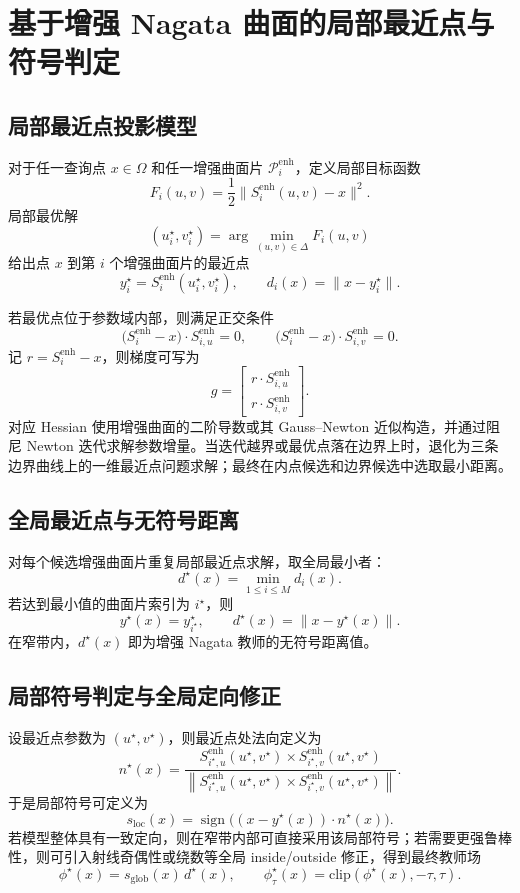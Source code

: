 \documentclass[12pt,oneside]{ctexbook}
\begin{document}
\section{基于增强 Nagata 曲面的局部最近点与符号判定}
\subsection{局部最近点投影模型}
对于任一查询点 $x\in\Omega$ 和任一增强曲面片 $\mathcal P_i^{\mathrm{enh}}$，定义局部目标函数
\[
F_i(u,v)=\frac{1}{2}\|S_i^{\mathrm{enh}}(u,v)-x\|^2.
\]
局部最优解
\[
(u_i^\star,v_i^\star)=\arg\min_{(u,v)\in\Delta}F_i(u,v)
\]
给出点 $x$ 到第 $i$ 个增强曲面片的最近点
\[
y_i^\star=S_i^{\mathrm{enh}}(u_i^\star,v_i^\star),
\qquad
d_i(x)=\|x-y_i^\star\|.
\]

若最优点位于参数域内部，则满足正交条件
\[
\big(S_i^{\mathrm{enh}}-x\big)\cdot S_{i,u}^{\mathrm{enh}}=0,
\qquad
\big(S_i^{\mathrm{enh}}-x\big)\cdot S_{i,v}^{\mathrm{enh}}=0.
\]
记 $r=S_i^{\mathrm{enh}}-x$，则梯度可写为
\[
g=
\begin{bmatrix}
r\cdot S_{i,u}^{\mathrm{enh}}\\
r\cdot S_{i,v}^{\mathrm{enh}}
\end{bmatrix}.
\]
对应 Hessian 使用增强曲面的二阶导数或其 Gauss--Newton 近似构造，并通过阻尼 Newton 迭代求解参数增量。当迭代越界或最优点落在边界上时，退化为三条边界曲线上的一维最近点问题求解；最终在内点候选和边界候选中选取最小距离。

\subsection{全局最近点与无符号距离}
对每个候选增强曲面片重复局部最近点求解，取全局最小者：
\[
d^\star(x)=\min_{1\le i\le M}d_i(x).
\]
若达到最小值的曲面片索引为 $i^\star$，则
\[
y^\star(x)=y_{i^\star}^\star,
\qquad
d^\star(x)=\|x-y^\star(x)\|.
\]
在窄带内，$d^\star(x)$ 即为增强 Nagata 教师的无符号距离值。

\subsection{局部符号判定与全局定向修正}
设最近点参数为 $(u^\star,v^\star)$，则最近点处法向定义为
\[
n^\star(x)=
\frac{S_{i^\star,u}^{\mathrm{enh}}(u^\star,v^\star)\times S_{i^\star,v}^{\mathrm{enh}}(u^\star,v^\star)}{\left\|S_{i^\star,u}^{\mathrm{enh}}(u^\star,v^\star)\times S_{i^\star,v}^{\mathrm{enh}}(u^\star,v^\star)\right\|}.
\]
于是局部符号可定义为
\[
s_{\mathrm{loc}}(x)=\operatorname{sign}\Big((x-y^\star(x))\cdot n^\star(x)\Big).
\]
若模型整体具有一致定向，则在窄带内部可直接采用该局部符号；若需要更强鲁棒性，则可引入射线奇偶性或绕数等全局 inside/outside 修正，得到最终教师场
\[
\phi^\star(x)=s_{\mathrm{glob}}(x)\,d^\star(x),
\qquad
\phi^\star_\tau(x)=\mathrm{clip}(\phi^\star(x),-\tau,\tau).
\]
\end{document}
